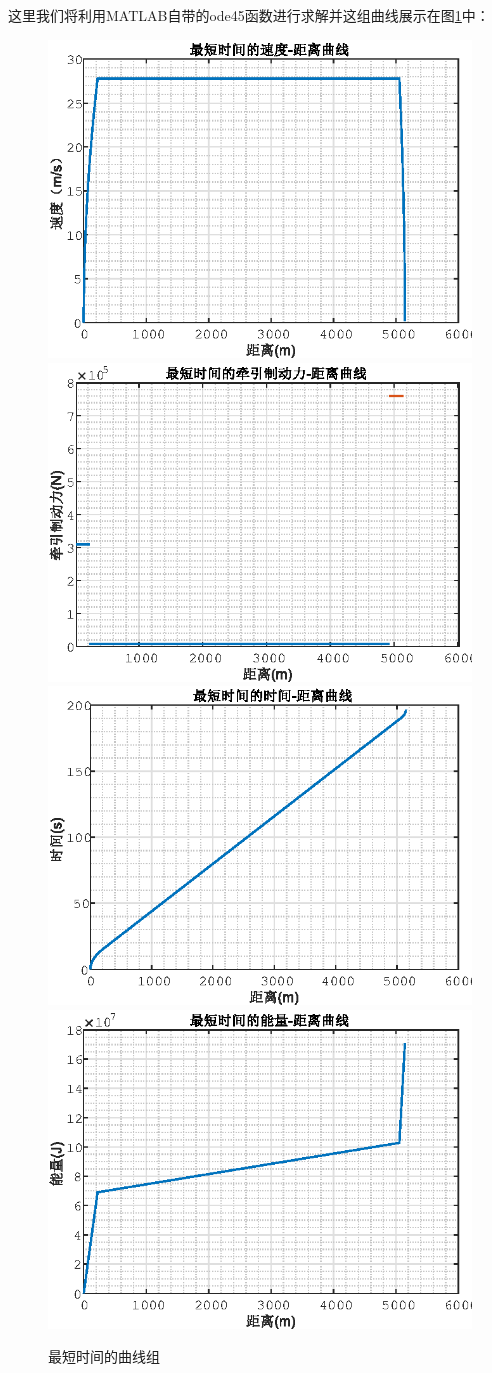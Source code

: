 \documentclass[12pt,a4paper]{nmmcm}
\begin{document}
这里我们将利用MATLAB自带的ode45函数进行求解并这组曲线展示在图\ref{zd}中：
\begin{figure}[H]
\centering
\includegraphics[width=.49\textwidth]{figures/a.eps}
\includegraphics[width=.49\textwidth]{figures/b.eps}
\includegraphics[width=.49\textwidth]{figures/c.eps}
\includegraphics[width=.49\textwidth]{figures/d.eps}
\caption{\song\wuhao 最短时间的曲线组}\label{zd}
\end{figure}
\end{document}
